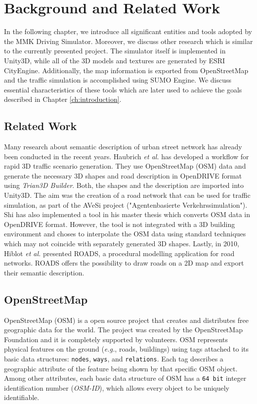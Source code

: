 \chapter{Background and Related Work}
\label{ch:background}
In the following chapter, we introduce all significant entities and tools adopted by the MMK Driving Simulator. Moreover, we discuss other research which is similar to the currently presented project. The simulator itself is implemented in Unity3D\cite{unity}, while all of the 3D models and textures are generated by ESRI CityEngine\cite{ce}. Additionally, the map information is exported from OpenStreetMap\cite{osm} and the traffic simulation is accomplished using SUMO Engine\cite{sumo}. We discuss essential characteristics of these tools which are later used to achieve the goals described in Chapter \ref{ch:introduction}. 

\section{Related Work}
Many research about semantic description of urban street network has already been conducted in the recent years. Haubrich \emph{et al.} has developed a workflow for rapid 3D traffic scenario generation\cite{haubrich2013semantic}. They use OpenStreetMap (OSM) data and generate the necessary 3D shapes and road description in OpenDRIVE\cite{dupuis2010opendrive} format using \emph{Trian3D Builder}. Both, the shapes and the description are imported into Unity3D. The aim was the creation of a road network that can be used for traffic simulation, as part of the AVeSi project ("Agentenbasierte Verkehrssimulation"). Shi has also implemented a tool in his master thesis\cite{shi2011automatic} which converts OSM data in OpenDRIVE format. However, the tool is not integrated with a 3D building environment and choses to interpolate the OSM data using standard techniques which may not coincide with separately generated 3D shapes. Lastly, in 2010, Hiblot \emph{et al.} presented ROADS\cite{hiblot2010pro}, a procedural modelling application for road networks. ROADS offers the possibility to draw roads on a 2D map and export their semantic description.  

\section{OpenStreetMap}
\label{ch:osm}
OpenStreetMap (OSM) is a open source project that creates and distributes free geographic data for the world. The project was created by the OpenStreetMap Foundation and it is completely supported by volunteers. OSM represents physical features on the ground (\emph{e.g.}, roads, buildings) using tags attached to its basic data structures: \texttt{nodes}, \texttt{ways}, and \texttt{relations}. Each tag describes a geographic attribute of the feature being shown by that specific OSM object. Among other attributes, each basic data structure of OSM has a \texttt{64 bit} integer identification number (\emph{OSM-ID}), which allows every object to be uniquely identifiable.

